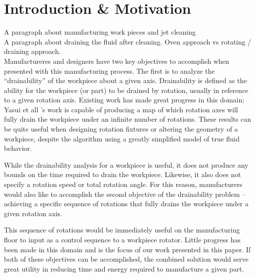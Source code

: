 							\chapter{Introduction \& Motivation}

A paragraph about manufacturing work pieces and jet cleaning
\\

A paragraph about draining the fluid after cleaning. Oven approach vs rotating / draining approach.
\\

Manufactureres and designers have two key objectives to accomplish when presented with this manufacturing process. The first is to analyze the ``drainability'' of the workpiece about a given axis. Drainability is defined as the ability for the workpiece (or part) to be drained by rotation, usually in reference to a given rotation axis. Existing work has made great progress in this domain; Yasui et all \cite{plot}'s work is capable of producing a map of which rotation axes will fully drain the workpiece under an infinite number of rotations. These results can be quite useful when designing rotation fixtures or altering the geometry of a workpiece, despite the algorithm using a greatly simplified model of true fluid behavior.

While the drainability analysis for a workpiece is useful, it does not produce any bounds on the time required to drain the workpiece. Likewise, it also does not specify a rotation speed or total rotation angle. For this reason, manufacturers would also like to accomplish the second objective of the drainability problem -- achieving a specific sequence of rotations that fully drains the workpiece under a given rotation axis.

This sequence of rotations would be immediately useful on the manufacturing floor to input as a control sequence to a workpiece rotator. Little progress has been made in this domain and is the focus of our work presented in this paper. If both of these objectives can be accomplished, the combined solution would serve great utility in reducing time and energy required to manufacture a given part.

